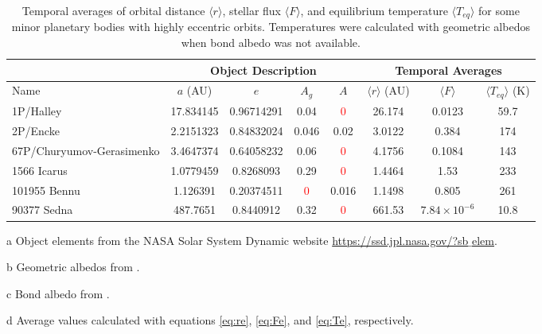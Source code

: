 \documentclass[a4paper,fleqn,usenatbib]{mnras}
\newcommand{\fix}{\textcolor{red}}
\begin{document}
\begin{table}
\begin{threeparttable}
\centering
\caption{Temporal averages of orbital distance $\langle r \rangle$, stellar flux $\langle F \rangle$, and equilibrium temperature $\langle T_{eq} \rangle$ for some minor planetary bodies with highly eccentric orbits. Temperatures were calculated with geometric albedos when bond albedo was not available.}
\begin{tabular}{ l c c c c c c c }
 \hline
 \hline
 & \multicolumn{4}{c}{Object Description\tnote{a}} & \multicolumn{3}{c}{Temporal Averages\tnote{d}} \\
 \hline
 Name & $a$ (AU) & $e$ & $A_g$\tnote{b} & $A$\tnote{c} &
 	$\langle r \rangle$ (AU) & $\langle F \rangle$ & $\langle T_{eq} \rangle$ (K) \\ 
 \hline
 1P/Halley & 17.834145 & 0.96714291 & 0.04 & \fix{0} & 26.174  & 0.0123 & 59.7 \\  
 2P/Encke & 2.2151323 & 0.84832024 & 0.046 & 0.02 & 3.0122  & 0.384 & 174 \\
 67P/Churyumov-Gerasimenko & 3.4647374 & 0.64058232 & 0.06 & \fix{0} & 4.1756  & 0.1084 & 143 \\
 1566 Icarus & 1.0779459 & 0.8268093 & 0.29 & \fix{0} & 1.4464  & 1.53 & 233 \\
 101955	Bennu & 1.126391 & 0.20374511 & \fix{0} & 0.016   & 1.1498 & 0.805 & 261 \\
 90377 Sedna & 487.7651 & 0.8440912 & 0.32 & \fix{0} & 661.53  & $7.84\times10^{-6}$ & 10.8 \\
 \hline
 \hline
\end{tabular}
\label{tab:elliptic}
	\begin{tablenotes}
	\small
\item[a]{Object elements from the NASA Solar System Dynamic website \href{https://ssd.jpl.nasa.gov/?sb$\_$elem}{https://ssd.jpl.nasa.gov/?sb$\_$elem}.}
\item[b] {Geometric albedos from \citet{2004come.book..223L,2015Sci...347a0628C,2012A&A...541L...6P,2015ApJ...814..117N}.}
\item[c] {Bond albedo from \citet{2015Icar..252..393T}.}
\item[d]{Average values calculated with equations \ref{eq:re}, \ref{eq:Fe}, and \ref{eq:Te}, respectively.}
	\end{tablenotes}
\end{threeparttable}
\end{table}
\end{document}
